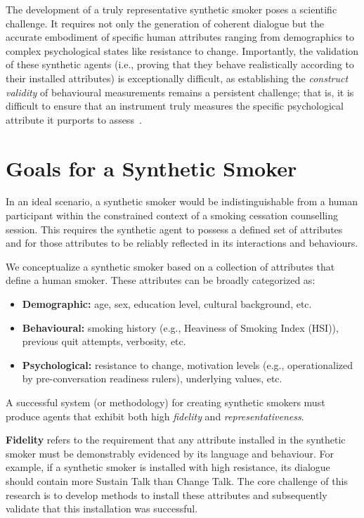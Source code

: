 The development of a truly representative synthetic smoker poses a scientific challenge. It requires not only the generation of coherent dialogue but the accurate embodiment of specific human attributes ranging from demographics to complex psychological states like resistance to change. Importantly, the validation of these synthetic agents (i.e., proving that they behave realistically according to their installed attributes) is exceptionally difficult, as establishing the \textit{construct validity} of behavioural measurements remains a persistent challenge; that is, it is difficult to ensure that an instrument truly measures the specific psychological attribute it purports to assess~\cite{Cronbach1955}.


\section{Goals for a Synthetic Smoker}
\label{sec:synthetic-smoker-ideal}

In an ideal scenario, a synthetic smoker would be indistinguishable from a human participant within the constrained context of a smoking cessation counselling session. This requires the synthetic agent to possess a defined set of attributes and for those attributes to be reliably reflected in its interactions and behaviours.

We conceptualize a synthetic smoker based on a collection of attributes that define a human smoker. These attributes can be broadly categorized as:

\begin{itemize}
	\item \textbf{Demographic:} age, sex, education level, cultural background, etc.
	\item \textbf{Behavioural:} smoking history (e.g., Heaviness of Smoking Index (HSI)), previous quit attempts, verbosity, etc.
	\item \textbf{Psychological:} resistance to change, motivation levels (e.g., operationalized by pre-conversation readiness rulers), underlying values, etc.
\end{itemize}

A successful system (or methodology) for creating synthetic smokers must produce agents that exhibit both high \emph{fidelity} and \emph{representativeness}.

\textbf{Fidelity} refers to the requirement that any attribute installed in the synthetic smoker must be demonstrably evidenced by its language and behaviour. For example, if a synthetic smoker is installed with high resistance, its dialogue should contain more Sustain Talk than Change Talk. The core challenge of this research is to develop methods to install these attributes and subsequently validate that this installation was successful.

